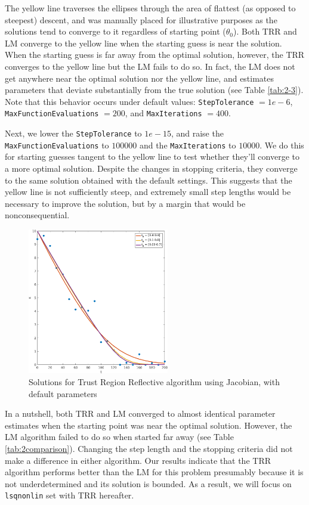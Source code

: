 The yellow line traverses the ellipses through the area of flattest (as opposed to steepest) descent, and was manually placed for illustrative purposes as the solutions tend to converge to it regardless of starting point ($\theta_0$). Both TRR and LM converge to the yellow line when the starting guess is near the solution. When the starting guess is far away from the optimal solution, however, the TRR converges to the yellow line but the LM fails to do so. In fact, the LM does not get anywhere near the optimal solution nor the yellow line, and estimates parameters that deviate substantially from the true solution (see Table \ref{tab:2-3}). Note that this behavior occurs under default values: \texttt{StepTolerance} $= 1e-6$, \texttt{MaxFunctionEvaluations} $= 200$, and \texttt{MaxIterations} $= 400$. 

Next, we lower the \texttt{StepTolerance} to $1e-15$, and raise the \texttt{MaxFunctionEvaluations} to $100000$ and the \texttt{MaxIterations} to $10000$. We do this for starting guesses tangent to the yellow line to test whether they'll converge to a more optimal solution. Despite the changes in stopping criteria, they converge to the same solution obtained with the default settings. This suggests that the yellow line is not sufficiently steep, and extremely small step lengths would be necessary to improve the solution, but by a margin that would be nonconsequential. 

\begin{figure}[htb]
\centering
\includegraphics[width=0.55\textwidth]{../img/2-3}
\caption{Solutions for Trust Region Reflective algorithm using Jacobian, with default parameters}
\label{fig:2-3}
\end{figure}

In a nutshell, both TRR and LM converged to almost identical parameter estimates when the starting point was near the optimal solution. However, the LM algorithm failed to do so when started far away (see Table \ref{tab:2comparison}). Changing the step length and the stopping criteria did not make a difference in either algorithm. Our results indicate that the TRR algorithm performs better than the LM for this problem presumably because it is not underdetermined and its solution is bounded. As a result, we will focus on \texttt{lsqnonlin} set with TRR hereafter. 


